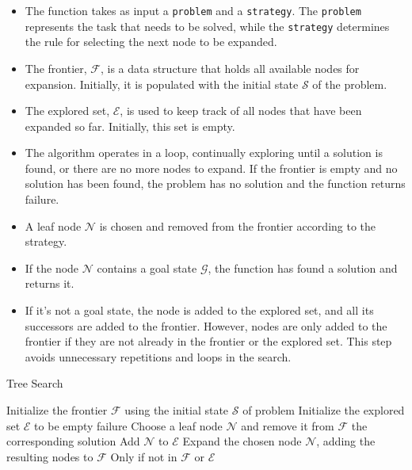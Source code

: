 \documentclass[a4paper,UKenglish,cleveref, autoref, thm-restate]{qlinhta}
\begin{document}
\begin{itemize}
\item The function takes as input a \texttt{problem} and a \texttt{strategy}. The \texttt{problem} represents the task that needs to be solved, while the \texttt{strategy} determines the rule for selecting the next node to be expanded.
\item The frontier, $\mathcal{F}$, is a data structure that holds all available nodes for expansion. Initially, it is populated with the initial state $\mathcal{S}$ of the problem.
\item The explored set, $\mathcal{E}$, is used to keep track of all nodes that have been expanded so far. Initially, this set is empty.
\item The algorithm operates in a loop, continually exploring until a solution is found, or there are no more nodes to expand. If the frontier is empty and no solution has been found, the problem has no solution and the function returns failure.
\item A leaf node $\mathcal{N}$ is chosen and removed from the frontier according to the strategy.
\item If the node $\mathcal{N}$ contains a goal state $\mathcal{G}$, the function has found a solution and returns it.
\item If it's not a goal state, the node is added to the explored set, and all its successors are added to the frontier. However, nodes are only added to the frontier if they are not already in the frontier or the explored set. This step avoids unnecessary repetitions and loops in the search.
\end{itemize}
\begin{algorithm}[H]
\caption{Tree Search}\label{alg:tree_search}
\begin{algorithmic}[1]
\State Initialize the frontier $\mathcal{F}$ using the initial state $\mathcal{S}$ of problem
\State Initialize the explored set $\mathcal{E}$ to be empty
        \State \Return failure
    \EndIf
    \State Choose a leaf node $\mathcal{N}$ and remove it from $\mathcal{F}$
        \State \Return the corresponding solution
    \EndIf
    \State Add $\mathcal{N}$ to $\mathcal{E}$
    \State Expand the chosen node $\mathcal{N}$, adding the resulting nodes to $\mathcal{F}$
    \State Only if not in $\mathcal{F}$ or $\mathcal{E}$
\EndWhile
\EndProcedure
\end{algorithmic}
\end{algorithm}
\end{document}
